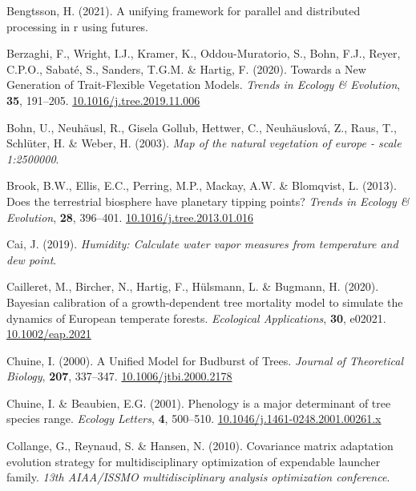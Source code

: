 \documentclass[11pt,]{article}
\newlength{\cslhangindent}
\newenvironment{CSLReferences}[2] %
 {%
  \setlength{\parindent}{0pt}
  \ifodd #1 \everypar{\setlength{\hangindent}{\cslhangindent}}\ignorespaces\fi
  \ifnum #2 > 0
  \setlength{\parskip}{#2\baselineskip}
  \fi
 }%
 {}
\begin{document}
\begin{CSLReferences}{1}{0}
\leavevmode{}%
Bengtsson, H. (2021). A unifying framework for parallel and distributed
processing in r using futures.

\leavevmode{}%
Berzaghi, F., Wright, I.J., Kramer, K., Oddou-Muratorio, S., Bohn, F.J.,
Reyer, C.P.O., Sabaté, S., Sanders, T.G.M. \& Hartig, F. (2020). Towards
a {New} {Generation} of {Trait}-{Flexible} {Vegetation} {Models}.
\emph{Trends in Ecology \& Evolution}, \textbf{35}, 191--205.
\href{https://doi.org/10.1016/j.tree.2019.11.006}{10.1016/j.tree.2019.11.006}

\leavevmode{}%
Bohn, U., Neuhäusl, R., Gisela Gollub, Hettwer, C., Neuhäuslová, Z.,
Raus, T., Schlüter, H. \& Weber, H. (2003). \emph{Map of the natural
vegetation of europe - scale 1:2500000}.

\leavevmode{}%
Brook, B.W., Ellis, E.C., Perring, M.P., Mackay, A.W. \& Blomqvist, L.
(2013). Does the terrestrial biosphere have planetary tipping points?
\emph{Trends in Ecology \& Evolution}, \textbf{28}, 396--401.
\href{https://doi.org/10.1016/j.tree.2013.01.016}{10.1016/j.tree.2013.01.016}

\leavevmode{}%
Cai, J. (2019). \emph{Humidity: Calculate water vapor measures from
temperature and dew point}.

\leavevmode{}%
Cailleret, M., Bircher, N., Hartig, F., Hülsmann, L. \& Bugmann, H.
(2020). Bayesian calibration of a growth-dependent tree mortality model
to simulate the dynamics of {European} temperate forests.
\emph{Ecological Applications}, \textbf{30}, e02021.
\href{https://doi.org/10.1002/eap.2021}{10.1002/eap.2021}

\leavevmode{}%
Chuine, I. (2000). A {Unified} {Model} for {Budburst} of {Trees}.
\emph{Journal of Theoretical Biology}, \textbf{207}, 337--347.
\href{https://doi.org/10.1006/jtbi.2000.2178}{10.1006/jtbi.2000.2178}

\leavevmode{}%
Chuine, I. \& Beaubien, E.G. (2001). Phenology is a major determinant of
tree species range. \emph{Ecology Letters}, \textbf{4}, 500--510.
\href{https://doi.org/10.1046/j.1461-0248.2001.00261.x}{10.1046/j.1461-0248.2001.00261.x}

\leavevmode{}%
Collange, G., Reynaud, S. \& Hansen, N. (2010). Covariance matrix
adaptation evolution strategy for multidisciplinary optimization of
expendable launcher family. \emph{13th AIAA/ISSMO multidisciplinary
analysis optimization conference}.


\end{CSLReferences}
\end{document}
